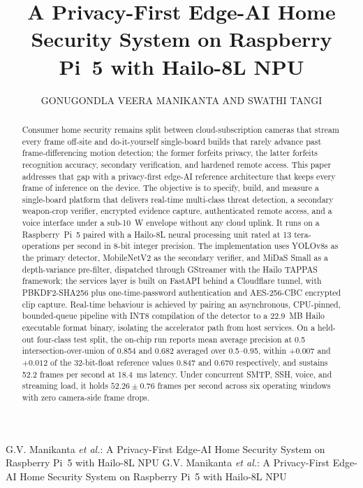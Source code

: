 \documentclass{ieeeaccess}
\begin{document}
\history{}
\doi{}

\title{A Privacy-First Edge-AI Home Security System on Raspberry Pi~5 with Hailo-8L NPU}
\author{\uppercase{Gonugondla Veera Manikanta} \uppercase{and Swathi Tangi}}

\address[1]{Department of Electrical and Electronics Engineering, Manipal Institute of Technology, Manipal Academy of Higher Education, Manipal, Karnataka, India (e-mail: manikantagonugondla@gmail.com; swathi.tangi@manipal.edu)}

\markboth
{G.V. Manikanta \emph{et al.}: A Privacy-First Edge-AI Home Security System on Raspberry Pi~5 with Hailo-8L NPU}
{G.V. Manikanta \emph{et al.}: A Privacy-First Edge-AI Home Security System on Raspberry Pi~5 with Hailo-8L NPU}



\begin{abstract}
Consumer home security remains split between cloud-subscription cameras that stream every frame off-site and do-it-yourself single-board builds that rarely advance past frame-differencing motion detection; the former forfeits privacy, the latter forfeits recognition accuracy, secondary verification, and hardened remote access. This paper addresses that gap with a privacy-first edge-AI reference architecture that keeps every frame of inference on the device. The objective is to specify, build, and measure a single-board platform that delivers real-time multi-class threat detection, a secondary weapon-crop verifier, encrypted evidence capture, authenticated remote access, and a voice interface under a sub-10~W envelope without any cloud uplink. It runs on a Raspberry~Pi~5 paired with a Hailo-8L neural processing unit rated at 13 tera-operations per second in 8-bit integer precision. The implementation uses YOLOv8s as the primary detector, MobileNetV2 as the secondary verifier, and MiDaS Small as a depth-variance pre-filter, dispatched through GStreamer with the Hailo TAPPAS framework; the services layer is built on FastAPI behind a Cloudflare tunnel, with PBKDF2-SHA256 plus one-time-password authentication and AES-256-CBC encrypted clip capture. Real-time behaviour is achieved by pairing an asynchronous, CPU-pinned, bounded-queue pipeline with INT8 compilation of the detector to a 22.9~MB Hailo executable format binary, isolating the accelerator path from host services. On a held-out four-class test split, the on-chip run reports mean average precision at 0.5 intersection-over-union of 0.854 and 0.682 averaged over 0.5--0.95, within $+0.007$ and $+0.012$ of the 32-bit-float reference values 0.847 and 0.670 respectively, and sustains 52.2 frames per second at 18.4~ms latency. Under concurrent SMTP, SSH, voice, and streaming load, it holds $52.26 \pm 0.76$ frames per second across six operating windows with zero camera-side frame drops.
\end{abstract}
\end{document}
